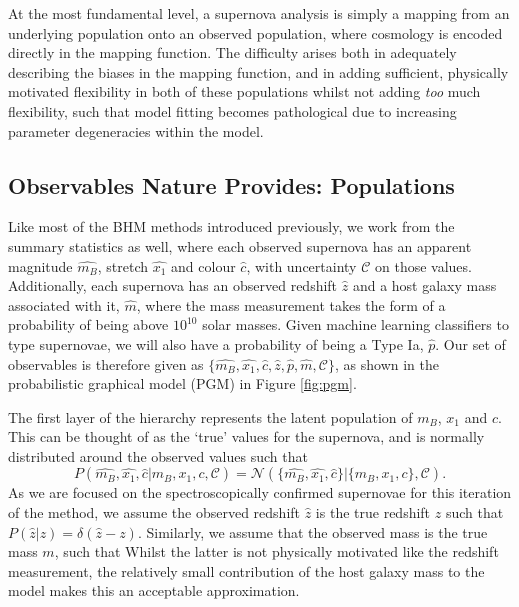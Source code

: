 \documentclass[a4paper,fleqn,usenatbib]{mnras}
\newcommand{\cov}{\mathcal{C}}
\begin{document}
At the most fundamental level, a supernova analysis is simply a mapping from an underlying population onto an observed population, where cosmology is encoded directly in the mapping function. The difficulty arises both in adequately describing the biases in the mapping function, and in adding sufficient, physically motivated flexibility in both of these populations whilst not adding \textit{too} much flexibility, such that model fitting becomes pathological due to increasing parameter degeneracies within the model.


\subsection{Observables Nature Provides: Populations}

Like most of the BHM methods introduced previously, we work from the summary statistics as well, where each observed supernova has an apparent magnitude $\hat{m_B}$, stretch $\hat{x_1}$ and colour $\hat{c}$, with uncertainty $\cov$ on those values. Additionally, each supernova has an observed redshift $\hat{z}$ and a host galaxy mass associated with it, $\hat{m}$, where the mass measurement takes the form of a probability of being above $10^10$ solar masses. Given machine learning classifiers to type supernovae, we will also have a probability of being a Type Ia, $\hat{p}$. Our set of observables is therefore given as $\lbrace \hat{m_B}, \hat{x_1}, \hat{c}, \hat{z}, \hat{p}, \hat{m}, \cov \rbrace$, as shown in the probabilistic graphical model (PGM) in Figure \ref{fig:pgm}.

The first layer of the hierarchy represents the latent population of $m_B$, $x_1$ and $c$. This can be thought of as the `true' values for the supernova, and is normally distributed around the observed values such that 
\begin{equation}
P(\hat{m_B},\hat{x_1},\hat{c}|m_B, x_1, c,\cov) = \mathcal{N}(\lbrace \hat{m_B},\hat{x_1},\hat{c} \rbrace|\lbrace m_B, x_1, c \rbrace, \cov). \label{eq:pop}
\end{equation}
As we are focused on the spectroscopically confirmed supernovae for this iteration of the method, we assume the observed redshift $\hat{z}$ is the true redshift $z$ such that $P(\hat{z}|z) = \delta(\hat{z} - z)$. Similarly, we assume that the observed mass is the true mass $m$, such that  Whilst the latter is not physically motivated like the redshift measurement, the relatively small contribution of the host galaxy mass to the model makes this an acceptable approximation.
\end{document}
